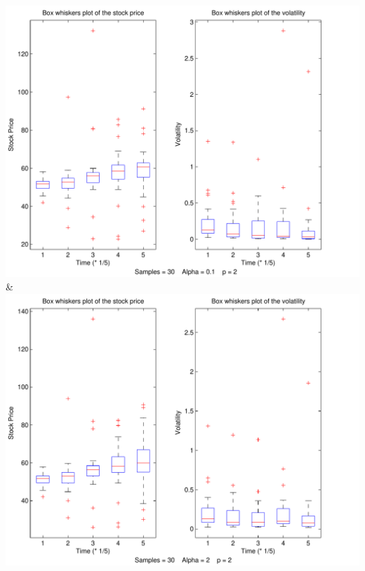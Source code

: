 \documentclass[a4paper,onecolumn]{IEEEtran}
\begin{document}
{		 \includegraphics[width=\stockplotsize]{box_s30_a0-1_p2}&
			\includegraphics[width=\stockplotsize]{box_s30_a2_p2}\LL
			}




	
\end{document}
